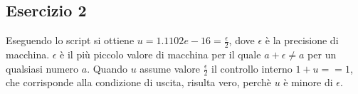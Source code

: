 \subsection{Esercizio 2}
Eseguendo lo script si ottiene $u = 1.1102e-16 = \frac{\epsilon}{2}$, dove $\epsilon$ è la precisione di macchina.
$\epsilon$ è il più piccolo valore di macchina per il quale $a + \epsilon \neq a$ per un qualsiasi numero $a$. Quando $u$ assume valore $\frac{\epsilon}{2}$ il controllo interno $1+u==1$, che corrisponde alla condizione di uscita, risulta vero, perchè $u$ è minore di $\epsilon$.
